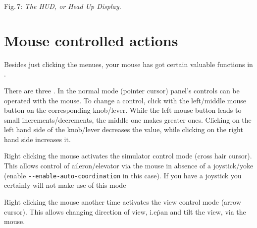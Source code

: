 \medskip

 \centerline{}

\smallskip
 \noindent
Fig.\,7: \textit{The HUD, or Head Up Display.}
\medskip

\section{Mouse controlled actions}

Besides just clicking the menues, your mouse has got certain valuable functions in \FlightGear{}.


There are three . In the normal mode
(pointer cursor) panel's controls can be operated with the mouse. To
change a control, click with the left/middle mouse button on the
corresponding knob/lever. While the left mouse button leads to small
increments/decrements, the middle one makes greater ones. Clicking on
the left hand side of the knob/lever decreases the value, while
clicking on the right hand side increases it.

 Right clicking the mouse activates the simulator control mode (cross
 hair cursor). This allows control of aileron/elevator via the mouse in
 absence of a joystick/yoke (enable \texttt{-$
 $-enable-auto-coordination} in this case). If you have a joystick you
 certainly will not make use of this mode

 Right clicking the mouse another time activates the view control mode (arrow cursor).
 This allows changing direction of view, i.e\. pan and tilt the view, via the mouse.


